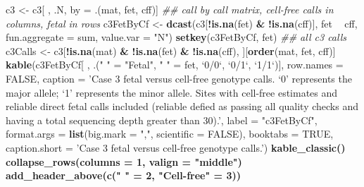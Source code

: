 \documentclass[11pt,letterpaper]{book}
\newenvironment{Shaded}{\begin{snugshade}}{\end{snugshade}}
\newcommand{\CommentTok}[1]{\textcolor[rgb]{0.56,0.35,0.01}{\textit{#1}}}
\newcommand{\DataTypeTok}[1]{\textcolor[rgb]{0.13,0.29,0.53}{#1}}
\newcommand{\DecValTok}[1]{\textcolor[rgb]{0.00,0.00,0.81}{#1}}
\newcommand{\KeywordTok}[1]{\textcolor[rgb]{0.13,0.29,0.53}{\textbf{#1}}}
\newcommand{\NormalTok}[1]{#1}
\newcommand{\OperatorTok}[1]{\textcolor[rgb]{0.81,0.36,0.00}{\textbf{#1}}}
\newcommand{\OtherTok}[1]{\textcolor[rgb]{0.56,0.35,0.01}{#1}}
\newcommand{\StringTok}[1]{\textcolor[rgb]{0.31,0.60,0.02}{#1}}
\begin{document}
\begin{Shaded}
\begin{Highlighting}[]
{{{{{{{{{{{{{{{{{{{{{{{{\NormalTok{c3 <-}\StringTok{ }\NormalTok{c3[ , .N, by =}\StringTok{ }\NormalTok{.(mat, fet, cff)]}
\CommentTok{## call by call matrix, cell-free calls in columns, fetal in rows}
\NormalTok{c3FetByCf <-}\StringTok{ }\KeywordTok{dcast}\NormalTok{(c3[}\OperatorTok{!}\KeywordTok{is.na}\NormalTok{(fet) }\OperatorTok{&}\StringTok{ }\OperatorTok{!}\KeywordTok{is.na}\NormalTok{(cff)], }
\NormalTok{                   fet }\OperatorTok{~}\StringTok{ }\NormalTok{cff,}
                   \DataTypeTok{fun.aggregate =}\NormalTok{ sum, }
                   \DataTypeTok{value.var =} \StringTok{"N"}\NormalTok{)}
\KeywordTok{setkey}\NormalTok{(c3FetByCf, fet)}
\CommentTok{## all c3 calls}
\NormalTok{c3Calls <-}\StringTok{ }\NormalTok{c3[}\OperatorTok{!}\KeywordTok{is.na}\NormalTok{(mat) }\OperatorTok{&}\StringTok{ }\OperatorTok{!}\KeywordTok{is.na}\NormalTok{(fet) }\OperatorTok{&}\StringTok{ }\OperatorTok{!}\KeywordTok{is.na}\NormalTok{(cff), ][}\KeywordTok{order}\NormalTok{(mat, fet, cff)]}
\KeywordTok{kable}\NormalTok{(c3FetByCf[ , .(}\StringTok{" "}\NormalTok{ =}\StringTok{ "Fetal"}\NormalTok{, }\StringTok{" "}\NormalTok{ =}\StringTok{ }\NormalTok{fet, }\StringTok{`}\DataTypeTok{0/0}\StringTok{`}\NormalTok{, }\StringTok{`}\DataTypeTok{0/1}\StringTok{`}\NormalTok{, }\StringTok{`}\DataTypeTok{1/1}\StringTok{`}\NormalTok{)], }
      \DataTypeTok{row.names =} \OtherTok{FALSE}\NormalTok{,}
      \DataTypeTok{caption =} \StringTok{'Case 3 fetal versus cell-free genotype calls. `0' represents the major allele; `1' represents the minor allele. Sites with cell-free estimates and reliable direct fetal calls included (reliable defied as passing all quality checks and having a total sequencing depth greater than 30).'}\NormalTok{,}
      \DataTypeTok{label =} \StringTok{"c3FetByCf"}\NormalTok{,}
      \DataTypeTok{format.args =} \KeywordTok{list}\NormalTok{(}\DataTypeTok{big.mark =} \StringTok{","}\NormalTok{, }\DataTypeTok{scientific =} \OtherTok{FALSE}\NormalTok{),}
      \DataTypeTok{booktabs =} \OtherTok{TRUE}\NormalTok{,}
      \DataTypeTok{caption.short =} \StringTok{'Case 3 fetal versus cell-free genotype calls.'}\NormalTok{) }\OperatorTok{%>%}
\StringTok{  }\KeywordTok{kable_classic}\NormalTok{() }\OperatorTok{%>%}
\StringTok{  }\KeywordTok{collapse_rows}\NormalTok{(}\DataTypeTok{columns =} \DecValTok{1}\NormalTok{, }\DataTypeTok{valign =} \StringTok{"middle"}\NormalTok{) }\OperatorTok{%>%}
\StringTok{  }\KeywordTok{add_header_above}\NormalTok{(}\KeywordTok{c}\NormalTok{(}\StringTok{" "}\NormalTok{ =}\StringTok{ }\DecValTok{2}\NormalTok{, }\StringTok{"Cell-free"}\NormalTok{ =}\StringTok{ }\DecValTok{3}\NormalTok{))}
}}}}}}}}}}}}}}}}}}}}}}}}}}}
\end{Highlighting}
\end{Shaded}
\end{document}
